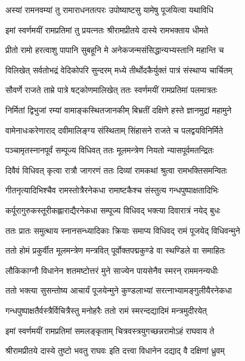 \twolineshloka
{अस्यां रामनवम्यां तु रामाराधनतत्परः}%
{उपोष्याष्टसु यामेषु पूजयित्वा यथाविधि}

\twolineshloka
{इमां स्वर्णमयीं रामप्रतिमां तु प्रयत्नतः}%
{श्रीरामप्रीतये दास्ये रामभक्ताय धीमते}

\twolineshloka
{प्रीतो रामो हरत्वाशु पापानि सुबहूनि मे}%
{अनेकजन्मसंसिद्धान्यभ्यस्तानि महान्ति च}

\twolineshloka
{विलिखेत् सर्वतोभद्रं वेदिकोपरि सुन्दरम्}%
{मध्ये तीर्थोदकैर्युक्तं पात्रं संस्थाप्य चार्चितम्}

\twolineshloka
{सौवर्णे राजते ताम्रे पात्रे षट्कोणमालिखेत्}%
{ततः स्वर्णमयीं रामप्रतिमां पलमात्रतः}

\twolineshloka
{निर्मितां द्विभुजां रम्यां वामाङ्कस्थितजानकीम्}%
{बिभ्रतीं दक्षिणे हस्ते ज्ञानमुद्रां महामुने}

\twolineshloka
{वामेनाधःकरेणाराद् दवीमालिङ्ग्य संस्थिताम्}%
{सिंहासने राजते च पलद्वयविनिर्मिते}

\twolineshloka
{पञ्चामृतस्नानपूर्वं सम्पूज्य विधिवत् ततः}%
{मूलमन्त्रेण नियतो न्यासपूर्वमतन्द्रितः}

\twolineshloka
{दिवैवं विधिवत् कृत्वा रात्रौ जागरणं ततः}%
{दिव्यां रामकथां श्रुत्वा रामभक्तिसमन्वितः}

\twolineshloka
{गीतनृत्यादिभिश्चैव रामस्तोत्रैरनेकधा}%
{रामाष्टकैश्च संस्तुत्य गन्धपुष्पाक्षतादिभिः}

\twolineshloka
{कर्पूरागुरुकस्तूरीकह्लाराद्यैरनेकधा}%
{सम्पूज्य विधिवद् भक्त्या दिवारात्रं नयेद् बुधः}

\twolineshloka
{ततः प्रातः समुत्थाय स्नानसन्ध्यादिकाः क्रियाः}%
{समाप्य विधिवद् रामं पूजयेद् विधिवन्मुने}

\twolineshloka
{ततो होमं प्रकुर्वीत मूलमन्त्रेण मन्त्रवित्}%
{पूर्वोक्तपद्मकुण्डे वा स्थण्डिले वा समाहितः}

\twolineshloka
{लौकिकाग्नौ विधानेन शतमष्टोत्तरं मुने}%
{साज्येन पायसेनैव स्मरन् राममनन्यधीः}

\twolineshloka
{ततो भक्त्या सुसन्तोष्य आचार्यं पूजयेन्मुने}%
{कुण्डलाभ्यां सरत्नाभ्यामङ्गुलीयैरनेकधा}

\twolineshloka
{गन्धपुष्पाक्षतैर्वस्त्रैर्विचित्रैस्तु मनोहरैः}%
{ततो रामं स्मरन्दद्यादिमं मन्त्रमुदीरयेत्}

\twolineshloka
{इमां स्वर्णमयीं रामप्रतिमां समलङ्कृताम्}%
{चित्रवस्त्रयुगच्छन्नरामोऽहं राघवाय ते}

\twolineshloka
{श्रीरामप्रीतये दास्ये तुष्टो भवतु राघवः}%
{इति दत्त्वा विधानेन दद्याद् वै दक्षिणां ध्रुवम्}

